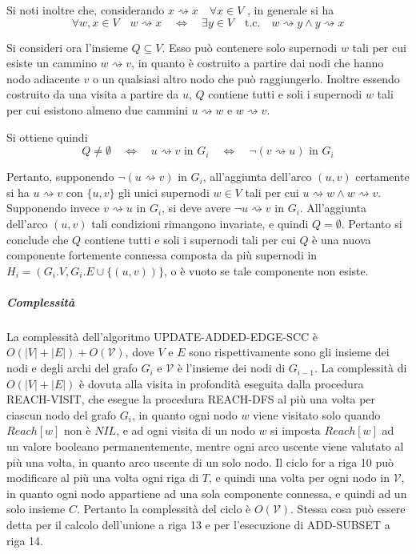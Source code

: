 Si noti inoltre che, considerando $x \rightsquigarrow x \quad \forall x \in V$ , in generale si ha
\begin{equation*}
    \forall w, x \in V \quad w \rightsquigarrow x \quad  \Longleftrightarrow \quad
    \exists y \in V \quad \text{t.c.} \quad w \rightsquigarrow y \land y \rightsquigarrow x
\end{equation*}

Si consideri ora l'insieme $Q \subseteq V$.
Esso pu\`o contenere solo supernodi $w$ tali per cui esiste un cammino $w \rightsquigarrow v$, in quanto \`e
costruito a partire dai nodi che hanno nodo adiacente $v$ o un qualsiasi altro nodo che pu\`o raggiungerlo.
Inoltre essendo costruito da una visita a partire da $u$, $Q$ contiene tutti e soli i supernodi $w$ tali per cui
esistono almeno due cammini $u \rightsquigarrow w$ e $w \rightsquigarrow v$. \newline

Si ottiene quindi
\begin{equation*}
    Q \neq \emptyset \quad \Longleftrightarrow \quad
    u \rightsquigarrow v \text{ in } G_i \quad \Longleftrightarrow \quad
    \lnot (v \rightsquigarrow u) \text{ in } G_i
\end{equation*}

Pertanto, supponendo $\lnot (u \rightsquigarrow v)$ in $G_i$, all'aggiunta dell'arco $(u, v)$ certamente si ha
$u \rightsquigarrow v$ con $\{u, v\}$ gli unici supernodi $w \in V$ tali per cui
$u \rightsquigarrow w \land w \rightsquigarrow v$. \newline
Supponendo invece $v \rightsquigarrow u$ in $G_i$, si deve avere  $\lnot u \rightsquigarrow v$ in $G_i$.
All'aggiunta dell'arco $(u, v)$ tali condizioni rimangono invariate, e quindi $Q = \emptyset$. \newline
Pertanto si conclude che $Q$ contiene tutti e soli i supernodi tali per cui $Q$ \`e una nuova componente fortemente
connessa composta da pi\`u supernodi in $H_{i} = (G_i.V, G_i.E \cup \{(u, v))\}$, o \`e vuoto se tale componente non
esiste.

\subparagraph{Complessità}
La complessit\`a dell'algoritmo UPDATE-ADDED-EDGE-SCC \`e $O(|V|+|E|) + O(\mathcal{V})$, dove $V$ e $E$ sono rispettivamente
sono gli insieme dei nodi e degli archi del grafo $G_i$ e $\mathcal{V}$ \`e l'insieme dei nodi di $G_{i-1}$.\newline
La complessit\`a di $O(|V|+|E|)$ \`e dovuta alla visita in profondit\`a eseguita dalla procedura REACH-VISIT, che esegue
la procedura REACH-DFS al pi\`u una volta per ciascun nodo del grafo $G_i$, in quanto ogni nodo $w$ viene visitato
solo quando $Reach[w]$ non \`e $NIL$, e ad ogni visita di un nodo $w$ si imposta $Reach[w]$ ad un valore booleano
permanentemente, mentre ogni arco uscente viene valutato al pi\`u una volta, in quanto arco uscente di un solo nodo.
Il ciclo for a riga 10 pu\`o modificare al pi\`u una volta ogni riga di $T$, e quindi una volta per ogni nodo in
$\mathcal{V}$, in quanto ogni nodo appartiene ad una sola componente connessa, e quindi ad un solo insieme $C$.
Pertanto la complessit\`a del ciclo \`e $O(\mathcal{V})$.
Stessa cosa pu\`o essere detta per il calcolo dell'unione a riga 13 e per l'esecuzione di ADD-SUBSET a riga 14.

